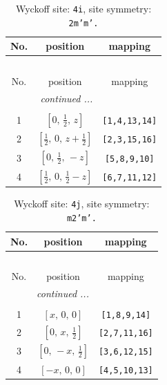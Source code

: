 \documentclass[fleqn,8pt]{jsarticle}
\begin{document}
\renewcommand{\arraystretch}{1.2}
\begin{longtable}{ccc}
\caption{Wyckoff site: {\tt 4i}, site symmetry: {\tt 2m'm'.}}
 \\
 \hline \hline
No. & position & mapping \\ \hline \endfirsthead

\multicolumn{2}{l}{\tablename\ \thetable{}} \\
 \hline \hline
No. & position & mapping \\ \hline \endhead

 \hline \hline
\multicolumn{2}{r}{\footnotesize\it continued ...} \\ \endfoot

 \hline \hline
\multicolumn{2}{r}{} \\ \endlastfoot

1 & $\left[ 0,\, \frac{1}{2},\, z \right]$ & {\tt [1,4,13,14]} \\ \hline
2 & $\left[ \frac{1}{2},\, 0,\, z + \frac{1}{2} \right]$ & {\tt [2,3,15,16]} \\ \hline
3 & $\left[ 0,\, \frac{1}{2},\, - z \right]$ & {\tt [5,8,9,10]} \\ \hline
4 & $\left[ \frac{1}{2},\, 0,\, \frac{1}{2} - z \right]$ & {\tt [6,7,11,12]} \\
\end{longtable}
\renewcommand{\arraystretch}{1.2}
\begin{longtable}{ccc}
\caption{Wyckoff site: {\tt 4j}, site symmetry: {\tt m2'm'.}}
 \\
 \hline \hline
No. & position & mapping \\ \hline \endfirsthead

\multicolumn{2}{l}{\tablename\ \thetable{}} \\
 \hline \hline
No. & position & mapping \\ \hline \endhead

 \hline \hline
\multicolumn{2}{r}{\footnotesize\it continued ...} \\ \endfoot

 \hline \hline
\multicolumn{2}{r}{} \\ \endlastfoot

1 & $\left[ x,\, 0,\, 0 \right]$ & {\tt [1,8,9,14]} \\ \hline
2 & $\left[ 0,\, x,\, \frac{1}{2} \right]$ & {\tt [2,7,11,16]} \\ \hline
3 & $\left[ 0,\, - x,\, \frac{1}{2} \right]$ & {\tt [3,6,12,15]} \\ \hline
4 & $\left[ - x,\, 0,\, 0 \right]$ & {\tt [4,5,10,13]} \\
\end{longtable}
\end{document}
